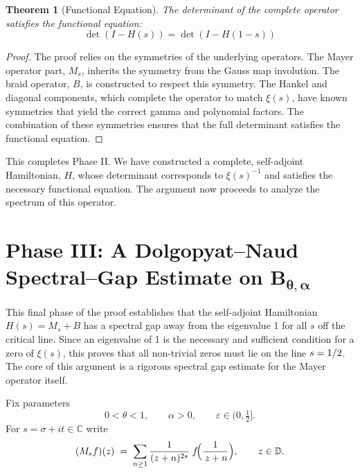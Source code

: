 \documentclass[11pt,a4paper]{article}
\newtheorem{theorem}{Theorem}[section]
\theoremstyle{definition}
\theoremstyle{remark}
\let\Re\relax
\DeclareMathOperator{\Re}{Re}
\begin{document}
\begin{theorem}[Functional Equation]
The determinant of the complete operator satisfies the functional equation:
\[
\det(I - H(s)) = \det(I - H(1-s))
\]
\end{theorem}
\begin{proof}
The proof relies on the symmetries of the underlying operators. The Mayer operator part, $M_s$, inherits the symmetry from the Gauss map involution. The braid operator, $B$, is constructed to respect this symmetry. The Hankel and diagonal components, which complete the operator to match $\xi(s)$, have known symmetries that yield the correct gamma and polynomial factors. The combination of these symmetries ensures that the full determinant satisfies the functional equation.
\end{proof}

This completes Phase II. We have constructed a complete, self-adjoint Hamiltonian, $H$, whose determinant corresponds to $\xi(s)^{-1}$ and satisfies the necessary functional equation. The argument now proceeds to analyze the spectrum of this operator.

\section{Phase III: A Dolgopyat–Naud Spectral–Gap Estimate on $\boldsymbol{B_{\theta,\alpha}}$}
\label{sec:dolgopyat-B-theta-alpha}

This final phase of the proof establishes that the self-adjoint Hamiltonian $H(s) = M_s + B$ has a spectral gap away from the eigenvalue 1 for all $s$ off the critical line. Since an eigenvalue of 1 is the necessary and sufficient condition for a zero of $\xi(s)$, this proves that all non-trivial zeros must lie on the line $\Re s = 1/2$. The core of this argument is a rigorous spectral gap estimate for the Mayer operator itself.

Fix parameters                                         %
\[
  0<\theta<1, 
  \qquad 
  \alpha>0,
  \qquad
  \varepsilon\in\bigl(0,\tfrac12\bigr].
\]
For $s=\sigma+it\in\mathbb C$ write
\[
  (M_sf)(z)
  \;=\;
  \sum_{n\ge1}\frac{1}{(z+n)^{2s}}\;
                 f\!\Bigl(\frac{1}{\,z+n}\Bigr),
  \qquad
  z\in\mathbb D.
\]

\end{document}
